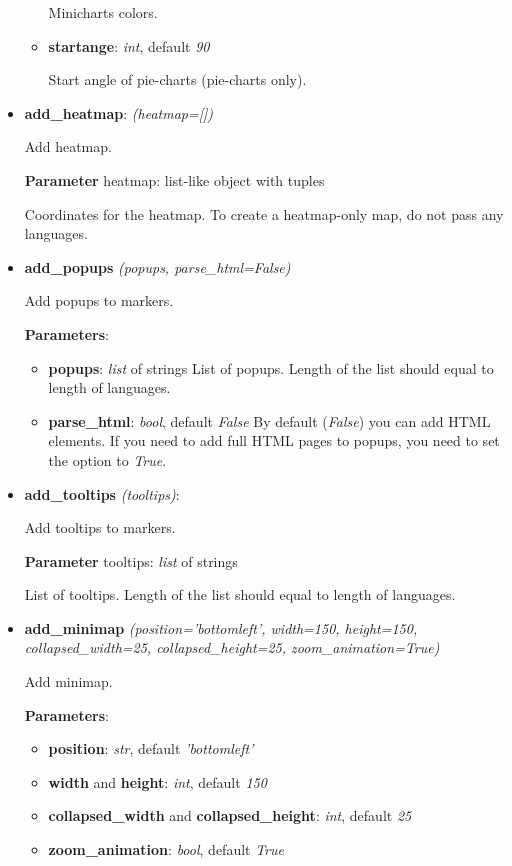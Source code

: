 \documentclass[a4paper,12pt]{article}
\begin{document}
\begin{itemize}
\begin{itemize}
 Minicharts colors.
 
 \item \textbf{startange}: \textit{int}, default \textit{90}
 
 Start angle of pie-charts (pie-charts only).
 
 \end{itemize}
 
 \item \textbf{add\_heatmap}: \textit{(heatmap=[])}
    
    Add heatmap.
    
    \textbf{Parameter} heatmap: list-like object with tuples
    
    Coordinates for the heatmap. To create a heatmap-only map, do not pass any languages.

 \item \textbf{add\_popups} \textit{(popups, parse\_html=False)}
    
    Add popups to markers.
    
    \textbf{Parameters}:
    \begin{itemize}
     \item \textbf{popups}: \textit{list} of strings
       List of popups. Length of the list should equal to length of languages.
     \item \textbf{parse\_html}: \textit{bool}, default \textit{False}
       By default (\textit{False}) you can add HTML elements.
       If you need to add full HTML pages to popups, you need to set the option to \textit{True}.
    \end{itemize}
    
 \item \textbf{add\_tooltips} \textit{(tooltips)}:
 
    Add tooltips to markers.
    
    \textbf{Parameter} tooltips: \textit{list} of strings
    
    List of tooltips. Length of the list should equal to length of languages.

 \item \textbf{add\_minimap} \textit{(position='bottomleft', width=150, height=150, collapsed\_width=25, collapsed\_height=25, zoom\_animation=True)}
 
 Add minimap.

 \textbf{Parameters}:
 \begin{itemize}
  \item \textbf{position}: \textit{str}, default \textit{'bottomleft'}
  \item \textbf{width} and \textbf{height}: \textit{int}, default \textit{150}
  \item \textbf{collapsed\_width} and \textbf{collapsed\_height}: \textit{int}, default \textit{25}
  \item \textbf{zoom\_animation}: \textit{bool}, default \textit{True}
  

\end{itemize}
\end{itemize}
\end{document}
